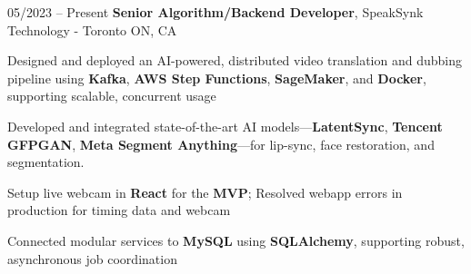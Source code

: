 \begin{twocolentry}{
    05/2023 – Present
}
\fontsize{11 pt}{11 pt}\textbf{Senior Algorithm/Backend Developer}, SpeakSynk Technology - Toronto ON, CA\end{twocolentry}

\vspace{0.10 cm}
\begin{onecolentry}
    \begin{highlights}
        \item Designed and deployed an AI-powered, distributed video translation and dubbing pipeline using \textbf{Kafka}, \newline \textbf{AWS Step Functions}, \textbf{SageMaker}, and \textbf{Docker}, supporting scalable, concurrent usage
        \item Developed and integrated state-of-the-art AI models—\textbf{LatentSync}, \textbf{Tencent GFPGAN}, \textbf{Meta Segment Anything}—for lip-sync, face restoration, and segmentation.
        \item Setup live webcam in \textbf{React} for the \textbf{MVP}; Resolved webapp errors in production for timing data and webcam 
        \item Connected modular services to \textbf{MySQL} using \textbf{SQLAlchemy}, supporting robust, asynchronous job coordination
    \end{highlights}
\end{onecolentry}
